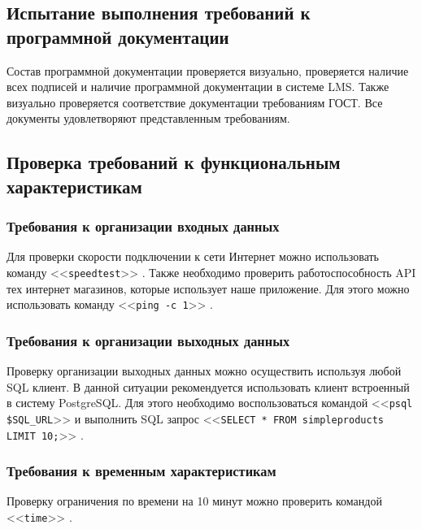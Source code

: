 \documentclass[a4paper,12pt]{article}
\begin{document}
  \subsection{Испытание выполнения требований к программной документации}
  Состав программной документации проверяется визуально,
  проверяется наличие всех подписей и наличие программной документации в системе LMS.
  Также визуально проверяется соответствие документации требованиям ГОСТ. Все документы удовлетворяют представленным требованиям.

  \subsection{Проверка требований к функциональным характеристикам}

  \subsubsection{Требования к организации входных данных}
  Для проверки скорости подключении к сети Интернет можно использовать команду <<\texttt{speedtest}>>
  .
  Также необходимо проверить работоспособность API тех интернет магазинов, которые использует наше приложение.
  Для этого можно использовать команду <<\texttt{ping -c 1}>>
  .

  \subsubsection{Требования к организации выходных данных}
  Проверку организации выходных данных можно осуществить используя любой SQL клиент.
  В данной ситуации рекомендуется использовать клиент встроенный в систему PostgreSQL.
  Для этого необходимо воспользоваться командой <<\texttt{psql \$SQL\_URL}>>
  и выполнить SQL запрос <<\texttt{SELECT * FROM simpleproducts LIMIT 10;}>>
  .

  \subsubsection{Требования к временным характеристикам}
  Проверку ограничения по времени на 10 минут можно проверить командой <<\texttt{time}>>
  .

\end{document}
